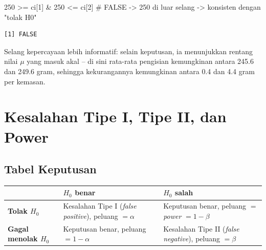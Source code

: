 \documentclass[
  indonesian,
  letterpaper,
]{book}
\newenvironment{Shaded}{\begin{snugshade}}{\end{snugshade}}
\newcommand{\CommentTok}[1]{\textcolor[rgb]{0.37,0.37,0.37}{#1}}
\newcommand{\DecValTok}[1]{\textcolor[rgb]{0.68,0.00,0.00}{#1}}
\newcommand{\NormalTok}[1]{\textcolor[rgb]{0.00,0.23,0.31}{#1}}
\newcommand{\SpecialCharTok}[1]{\textcolor[rgb]{0.37,0.37,0.37}{#1}}
\newcounter{none} %
\begin{document}
\begin{Shaded}
\begin{Highlighting}[]
\DecValTok{250} \SpecialCharTok{\textgreater{}=}\NormalTok{ ci[}\DecValTok{1}\NormalTok{] }\SpecialCharTok{\&} \DecValTok{250} \SpecialCharTok{\textless{}=}\NormalTok{ ci[}\DecValTok{2}\NormalTok{]   }\CommentTok{\# FALSE {-}\textgreater{} 250 di luar selang {-}\textgreater{} konsisten dengan "tolak H0"}
\end{Highlighting}
\end{Shaded}

\begin{verbatim}
[1] FALSE
\end{verbatim}

Selang kepercayaan lebih informatif: selain keputusan, ia menunjukkan
rentang nilai \(\mu\) yang masuk akal -- di sini rata-rata pengisian
kemungkinan antara 245.6 dan 249.6 gram, sehingga kekurangannya
kemungkinan antara 0.4 dan 4.4 gram per kemasan.


\chapter{Kesalahan Tipe I, Tipe II, dan
Power}\label{kesalahan-tipe-i-tipe-ii-dan-power}

\section{Tabel Keputusan}\label{tabel-keputusan}

{\def\LTcaptype{none} %
\begin{longtable}[]{@{}
  >{\raggedright\arraybackslash}p{}
  >{\raggedright\arraybackslash}p{}
  >{\raggedright\arraybackslash}p{}@{}}
\toprule\noalign{}
\begin{minipage}[b]{\linewidth}\raggedright
\end{minipage} & \begin{minipage}[b]{\linewidth}\raggedright
\(H_0\) benar
\end{minipage} & \begin{minipage}[b]{\linewidth}\raggedright
\(H_0\) salah
\end{minipage} \\
\midrule\noalign{}
\endhead
\bottomrule\noalign{}
\endlastfoot
\textbf{Tolak \(H_0\)} & Kesalahan Tipe I (\emph{false positive}),
peluang \(= \alpha\) & Keputusan benar, peluang \(=\) \emph{power}
\(= 1-\beta\) \\
\textbf{Gagal menolak \(H_0\)} & Keputusan benar, peluang \(= 1-\alpha\)
& Kesalahan Tipe II (\emph{false negative}), peluang \(= \beta\) \\
\end{longtable}
}
\end{document}
